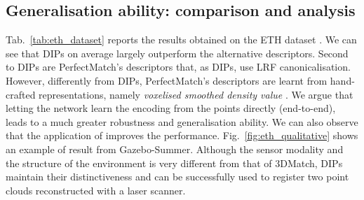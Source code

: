 \documentclass[a4paper,conference]{IEEEtran}
\begin{document}
\subsection{Generalisation ability: comparison and analysis}

Tab.~\ref{tab:eth_dataset} reports the results obtained on the ETH dataset \cite{Pomerleau2012}.
We can see that DIPs on average largely outperform the alternative descriptors.
Second to DIPs are PerfectMatch's descriptors \cite{Gojcic2019} that, as DIPs, use LRF canonicalisation.
However, differently from DIPs, PerfectMatch's descriptors are learnt from hand-crafted representations, namely \emph{voxelised smoothed density value} \cite{Gojcic2019}.
We argue that letting the network learn the encoding from the points directly (end-to-end), leads to a much greater robustness and generalisation ability.
We can also observe that the application of  improves the performance.
Fig.~\ref{fig:eth_qualitative} shows an example of result from Gazebo-Summer.
Although the sensor modality and the structure of the environment is very different from that of 3DMatch, DIPs maintain their distinctiveness and can be successfully used to register two point clouds reconstructed with a laser scanner.


\begin{table}[t]
    \tabcolsep 5pt
    \centering
    \caption{Feature-matching recall on the ETH dataset \cite{Pomerleau2012}.}
    \vspace{-.2cm}
    \label{tab:eth_dataset}
\end{table}
\end{document}
